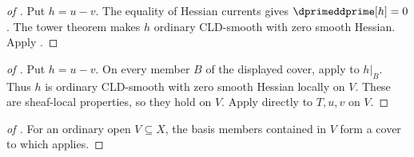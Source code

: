 \begin{proof}[of
]
Put $h=u-v$.  The equality of Hessian currents gives
$\dprimeddprime[h]=0$.  The tower theorem makes $h$ ordinary CLD-smooth
with zero smooth Hessian.  Apply .
\end{proof}

\begin{proof}[of
]
Put $h=u-v$.  On every member $B$ of the displayed cover, apply
 to $h|_B$.
Thus $h$ is ordinary CLD-smooth with zero smooth Hessian locally on $V$.
These are sheaf-local properties, so they hold on $V$.  Apply
 directly to $T,u,v$ on $V$.
\end{proof}

\begin{proof}[of
]
For an ordinary open $V\subseteq X$, the basis members contained in $V$
form a cover to which
applies.
\end{proof}
